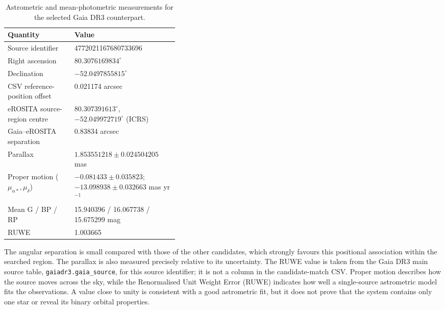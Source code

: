 \documentclass[12pt,a4paper]{article}
\begin{document}
\begin{table}[!ht]
\centering\small
\begin{tabularx}{\linewidth}{>{\raggedright\arraybackslash}p{0.39\linewidth}X}
\toprule
\rowcolor{lightblue}\textcolor{reportblue}{\textbf{Quantity}} & \textcolor{reportblue}{\textbf{Value}}\\
\midrule
Source identifier & 4772021167680733696\\
Right ascension & $80.3076169834^\circ$\\
Declination & $-52.0497855815^\circ$\\
CSV reference-position offset & 0.021174 arcsec\\
eROSITA source-region centre & $80.307391613^\circ$, $-52.049972719^\circ$ (ICRS)\\
Gaia--eROSITA separation & 0.83834 arcsec\\
Parallax & $1.853551218\pm0.024504205$ mas\\
Proper motion ($\mu_{\alpha*},\mu_\delta$) & $-0.081433\pm0.035823$; $-13.098938\pm0.032663$ mas yr$^{-1}$\\
Mean G / BP / RP & 15.940396 / 16.067738 / 15.675299 mag\\
RUWE & 1.003665\\
\bottomrule
\end{tabularx}
\caption{Astrometric and mean-photometric measurements for the selected Gaia DR3 counterpart.}
\end{table}

The angular separation is small compared with those of the other candidates, which strongly favours this positional association within the searched region. The parallax is also measured precisely relative to its uncertainty. The RUWE value is taken from the Gaia DR3 main source table, \texttt{gaiadr3.gaia\_source}, for this source identifier; it is not a column in the candidate-match CSV. Proper motion describes how the source moves across the sky, while the Renormalised Unit Weight Error (RUWE) indicates how well a single-source astrometric model fits the observations. A value close to unity is consistent with a good astrometric fit, but it does not prove that the system contains only one star or reveal its binary orbital properties.
\end{document}
